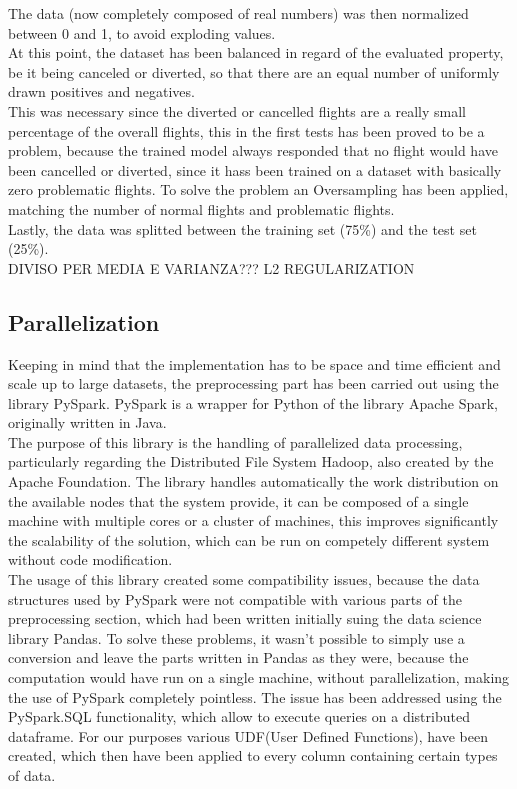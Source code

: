 \documentclass[
	letterpaper, %
	10pt, %
]{class}
\begin{document}
The data (now completely composed of real numbers) was then normalized between 0 and 1, to avoid exploding values.\\

At this point, the dataset has been balanced in regard of the evaluated property, be it being canceled or diverted, so that there are an equal number of uniformly drawn positives and negatives.\\

This was necessary since the diverted or cancelled flights are a really small percentage of the overall flights,
this in the first tests has been proved to be a problem, because the trained model always responded that no flight would have been cancelled or diverted, since it hass been trained on a dataset with basically zero problematic flights.
To solve the problem an Oversampling has been applied, matching the number of normal flights and problematic flights.\\

 Lastly, the data was splitted between the training set (75\%) and the test set (25\%).\\

DIVISO PER MEDIA E VARIANZA??? L2 REGULARIZATION

\subsection{Parallelization}

Keeping in mind that the implementation has to be space and time efficient and scale up to large datasets, the preprocessing part has been carried out using the library PySpark.
PySpark is a wrapper for Python of the library Apache Spark, originally written in Java.\\

The purpose of this library is the handling of parallelized data processing, particularly regarding the Distributed File System Hadoop, also created by the Apache Foundation.
The library handles automatically the work distribution on the available nodes that the system provide, it can be composed of a single machine with multiple cores or a cluster of machines, this improves significantly the scalability of the solution, which can be run on competely different system without code modification.\\

The usage of this library created some compatibility issues, because the data structures used by PySpark were not compatible with various parts of the preprocessing section, which had been written initially suing the data science library Pandas.
To solve these problems, it wasn't possible to simply use a conversion and leave the parts written in Pandas as they were, because the computation would have run on a single machine, without parallelization, making the use of PySpark completely pointless.
The issue has been addressed using the PySpark.SQL functionality, which allow to execute queries on a distributed dataframe. For our purposes various UDF(User Defined Functions), have been created, which then have been applied to every column containing certain types of data.\\
\end{document}
